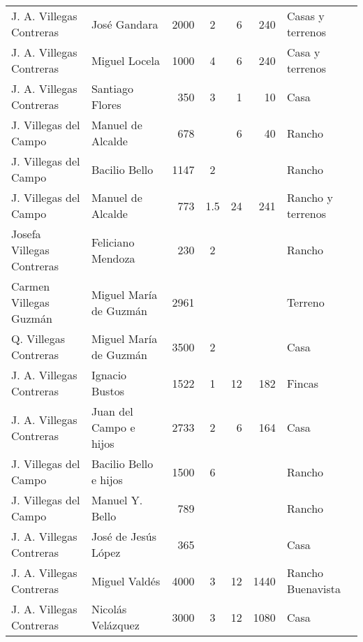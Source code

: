 \documentclass[14pt,twoside,final]{extbook} %
\begin{document}
{\begin{longtable}[c]{@{}p{2.5cm}lrSrrl@{}}
J. A. Villegas Contreras & José Gandara & 2000 & 2 & 6 & 240 & Casas y terrenos \\
J. A. Villegas Contreras & Miguel Locela & 1000 & 4 & 6 & 240 & Casa y terrenos \\
J. A. Villegas Contreras & Santiago Flores & 350 & 3 & 1 & 10 & Casa \\
J. Villegas del Campo & Manuel de Alcalde & 678 & & 6 & 40 & Rancho \\
J. Villegas del Campo & Bacilio Bello & 1147 & 2 & {} & {} & Rancho \\
J. Villegas del Campo & Manuel de Alcalde & 773 & 1.5 & 24 & 241 & Rancho y terrenos \\
Josefa Villegas Contreras & Feliciano Mendoza & 230 & 2 & {} & {} & Rancho \\
Carmen Villegas Guzmán & Miguel María de Guzmán & 2961 & {} & {} & {} & Terreno \\
Q. Villegas Contreras & Miguel María de Guzmán & 3500 & 2 & {} & {} & Casa \\
J. A. Villegas Contreras & Ignacio Bustos & 1522 & 1 & 12 & 182 & Fincas \\
J. A. Villegas Contreras & Juan del Campo e hijos & 2733 & 2 & 6 & 164 & Casa \\
J. Villegas del Campo & Bacilio Bello e hijos & 1500 & 6 & {} & {} & Rancho \\
J. Villegas del Campo & Manuel Y. Bello & 789 & {} & {} & {} & Rancho \\
J. A. Villegas Contreras & José de Jesús López & 365 & {} & {} & {} & Casa \\
J. A. Villegas Contreras & Miguel Valdés & 4000 & 3 & 12 & 1440 & Rancho Buenavista \\
J. A. Villegas Contreras & Nicolás Velázquez & 3000 & 3 & 12 & 1080 & Casa \\

\end{longtable}}
\end{document}
